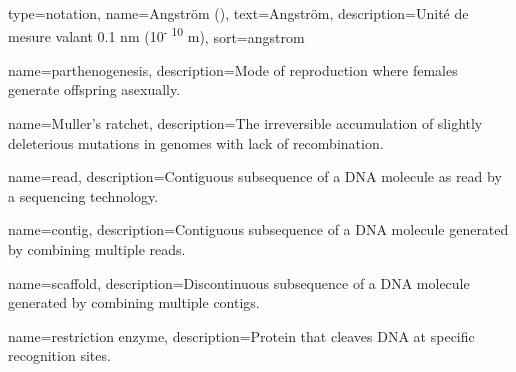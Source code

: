 



{
	type=notation,
	name={Angstr\" om (\angstrom)},
    text=Angstr\" om,
	description={Unité de mesure valant 0.1 nm (10\textsuperscript{- 10} m)},
	sort={angstrom}
}

{
		name={parthenogenesis},
		description={Mode of reproduction where females generate offspring asexually.}
}

{
		name={Muller's ratchet},
		description={The irreversible accumulation of slightly deleterious mutations in genomes with lack of recombination.}
}

{
	name={read},
	description={Contiguous subsequence of a DNA molecule as read by a sequencing technology.}}

{
	name={contig},
	description={Contiguous subsequence of a DNA molecule generated by combining multiple reads.}
}

{
	name={scaffold},
	description={Discontinuous subsequence of a DNA molecule generated by combining multiple contigs.}
}

{
	name={restriction enzyme},
	description={Protein that cleaves DNA at specific recognition sites.}
}



